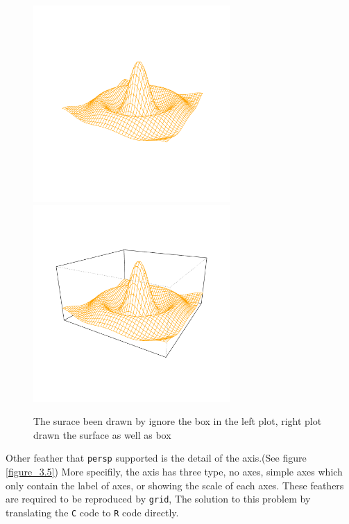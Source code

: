 \documentclass[paper=a4, fontsize=11pt]{report}
\begin{document}
\begin{figure}[h]
	\begin{center}
		\includegraphics[height = 7.5cm, width = 7.5cm]{figure/box_example_1.pdf}
		\includegraphics[height = 7.5cm, width = 7.5cm]{figure/box_example_2.pdf}
		\caption{The surace been drawn by ignore the box in the left plot, right plot drawn the surface as well as box}
		\label{figure_3.4}
	\end{center}
\end{figure}

Other feather that \texttt{persp} supported is the detail of the axis.(See figure \ref{figure_3.5}) More specifily, the axis has three type, no axes, simple axes which only contain the label of axes, or showing the scale of each axes. These feathers are required to be reproduced by \texttt{grid}, The solution to this problem by translating the \texttt{C} code to \texttt{R} code directly.
\end{document}
